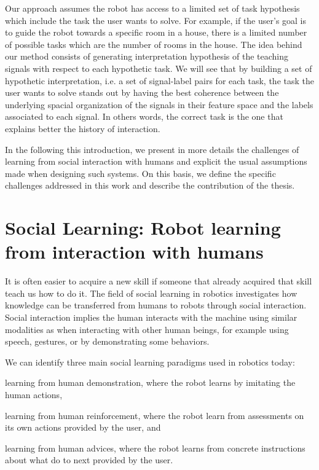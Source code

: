 Our approach assumes the robot has access to a limited set of task hypothesis which include the task the user wants to solve. For example, if the user's goal is to guide the robot towards a specific room in a house, there is a limited number of possible tasks which are the number of rooms in the house. The idea behind our method consists of generating interpretation hypothesis of the teaching signals with respect to each hypothetic task. We will see that by building a set of hypothetic interpretation, i.e. a set of signal-label pairs for each task, the task the user wants to solve stands out by having the best coherence between the underlying spacial organization of the signals in their feature space and the labels associated to each signal. In others words, the correct task is the one that explains better the history of interaction.

In the following this introduction, we present in more details the challenges of learning from social interaction with humans and explicit the usual assumptions made when designing such systems. On this basis, we define the specific challenges addressed in this work and describe the contribution of the thesis.

\section{Social Learning: Robot learning from interaction with humans}
\label{sec:intro:social}

It is often easier to acquire a new skill if someone that already acquired that skill teach us how to do it. The field of social learning in robotics investigates how knowledge can be transferred from humans to robots through social interaction. Social interaction implies the human interacts with the machine using similar modalities as when interacting with other human beings, for example using speech, gestures, or by demonstrating some behaviors. 

We can identify three main social learning paradigms used in robotics today: \begin{inparaenum}[(a)] \item learning from human demonstration, where the robot learns by imitating the human actions, \item learning from human reinforcement, where the robot learn from assessments on its own actions provided by the user, and \item learning from human advices, where the robot learns from concrete instructions about what do to next provided by the user. \end{inparaenum}

